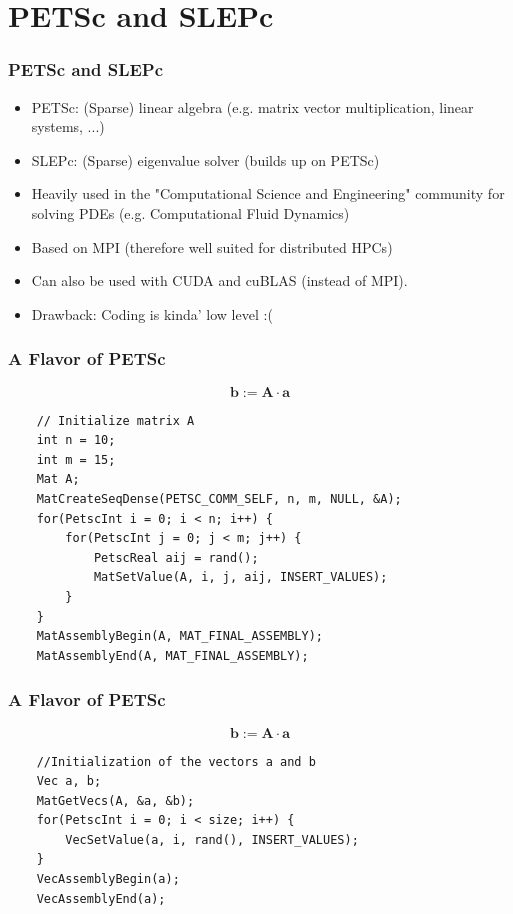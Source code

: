 \documentclass[compress]{beamer}
\begin{document}
\section{PETSc and SLEPc}
\begin{frame}
\frametitle{PETSc and SLEPc}
\begin{itemize}
	\item<1-> PETSc: (Sparse) linear algebra (e.g. matrix vector multiplication, linear systems, ...)
	\item<2-> SLEPc: (Sparse) eigenvalue solver (builds up on PETSc)
	\item<3-> Heavily used in the "Computational Science and Engineering" community for solving PDEs (e.g. Computational Fluid Dynamics)
	\item<4-> Based on MPI (therefore well suited for distributed HPCs)
	\item<5-> Can also be used with CUDA and cuBLAS (instead of MPI).
	\item<6-> Drawback: Coding is kinda' low level :(
\end{itemize}
\end{frame}

\begin{frame}[fragile]
\frametitle{A Flavor of PETSc}
$$
	\mathbf{b} := \mathbf{A} \cdot \mathbf{a}
$$
\begin{lstlisting}
    // Initialize matrix A
    int n = 10;
    int m = 15;
    Mat A;
    MatCreateSeqDense(PETSC_COMM_SELF, n, m, NULL, &A);
    for(PetscInt i = 0; i < n; i++) {
        for(PetscInt j = 0; j < m; j++) {
            PetscReal aij = rand();
            MatSetValue(A, i, j, aij, INSERT_VALUES);
        }
    }
    MatAssemblyBegin(A, MAT_FINAL_ASSEMBLY);
    MatAssemblyEnd(A, MAT_FINAL_ASSEMBLY);
\end{lstlisting}

\end{frame}

\begin{frame}[fragile]
\frametitle{A Flavor of PETSc}
$$
	\mathbf{b} := \mathbf{A} \cdot \mathbf{a}
$$
\begin{lstlisting}
    //Initialization of the vectors a and b
    Vec a, b;
    MatGetVecs(A, &a, &b);
    for(PetscInt i = 0; i < size; i++) {
        VecSetValue(a, i, rand(), INSERT_VALUES);
    }
    VecAssemblyBegin(a);
    VecAssemblyEnd(a);
\end{lstlisting}

\end{frame}
\end{document}
